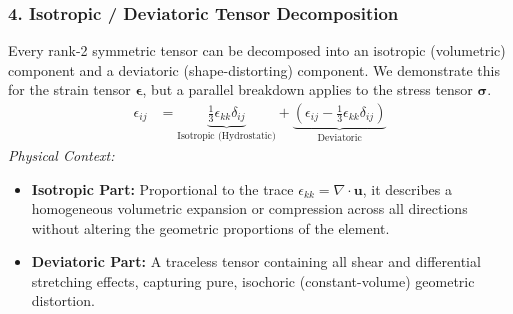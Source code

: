 \subsubsection*{4. Isotropic / Deviatoric Tensor Decomposition}
Every rank-2 symmetric tensor can be decomposed into an isotropic (volumetric) component and a deviatoric (shape-distorting) component. We demonstrate this for the strain tensor $\mathbf{\epsilon}$, but a parallel breakdown applies to the stress tensor $\mathbf{\sigma}$.
\begin{align}
    \epsilon_{ij} &= \underbrace{ \frac{1}{3} \epsilon_{kk} \delta_{ij} }_{\text{Isotropic (Hydrostatic)}} + \underbrace{ \left( \epsilon_{ij} - \frac{1}{3} \epsilon_{kk} \delta_{ij} \right) }_{\text{Deviatoric}}
\end{align}
\textit{Physical Context:}
\begin{itemize}
    \item \textbf{Isotropic Part:} Proportional to the trace $\epsilon_{kk} = \nabla \cdot \mathbf{u}$, it describes a homogeneous volumetric expansion or compression across all directions without altering the geometric proportions of the element.
    \item \textbf{Deviatoric Part:} A traceless tensor containing all shear and differential stretching effects, capturing pure, isochoric (constant-volume) geometric distortion.
\end{itemize}

